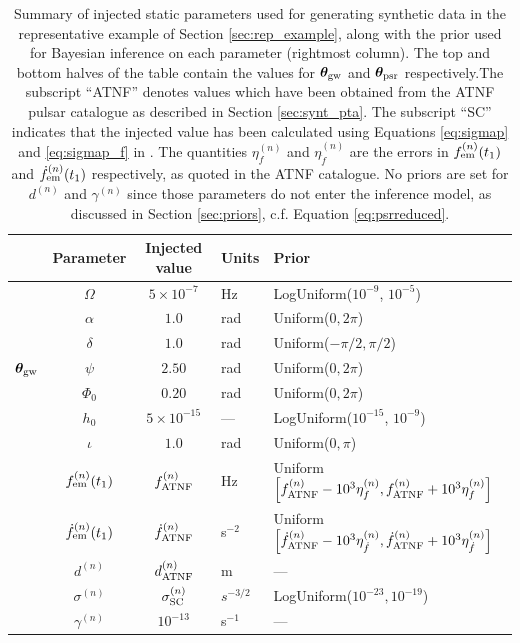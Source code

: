 \documentclass[fleqn,usenatbib,useAMS]{mnras}
\begin{document}
\begin{table}
	\centering
	\begin{tabular}{lccll}
		\toprule
		&Parameter & Injected value & Units & Prior  \\
		\hline
		\multirow{7}{2mm}{$\boldsymbol{\theta}_{\rm gw}$} & $\Omega$       & $5 \times 10^{-7}$ & Hz & LogUniform($10^{-9}$, $10^{-5}$) \\
	  & $\alpha$          & $1.0$  & rad & Uniform($0, 2 \pi $)\\
	  & $\delta$              & $1.0$  & rad & Uniform($-\pi/2, \pi/2$) \\
	  & $\psi$              & $2.50$ & rad & Uniform($0, 2 \pi $) \\
	  & $\Phi_0$          & $0.20$ & rad & Uniform($0, 2 \pi $) \\
	  & $h_0$            & $5 \times 10^{-15}$ & --- & LogUniform($10^{-15}$, $10^{-9}$) \\
	  & $\iota$             & $1.0$ & rad & Uniform($0, \pi$) \\ 
		\hline
		\vspace{1mm}\multirow{5}{2mm}{$\boldsymbol{\theta}_{\rm psr}$} & $f_{\rm em}^{(n)} (t_1)$       & $f_{\rm ATNF}^{(n)}$ & Hz & Uniform$\left[f_{\rm ATNF}^{(n)} - 10^3 \eta^{(n)}_{f}, f_{\rm ATNF}^{(n)} + 10^3 \eta^{(n)}_{f} \right]$ \\
		& $\dot{f}_{\rm em}^{(n)} (t_1)$       & $\dot{f}_{\rm ATNF}^{(n)}$ & s$^{-2}$ & Uniform$\left[ \dot{f}_{\rm ATNF}^{(n)} - 10^3 \eta^{(n)}_{\dot{f}}, \dot{f}_{\rm ATNF}^{(n)} + 10^3 \eta^{(n)}_{\dot{f}} \right]$ \\
		\vspace{1mm} &  $d^{(n)}$       &$d_{\rm ATNF}^{(n)}$  & m & --- \\
		\vspace{1mm} & $\sigma^{(n)}$              & $\sigma_{\rm SC}^{(n)}$ & $s^{-3/2}$ & LogUniform($10^{-23}, 10^{-19}$) \\
		& $\gamma^{(n)}$              & $10^{-13}$ & s$^{-1}$ & --- \\
		\bottomrule
	\end{tabular}
	\caption{Summary of injected static parameters used for generating synthetic data in the representative example of Section \ref{sec:rep_example}, along with the prior used for Bayesian inference on each parameter (rightmost column). The top and bottom halves of the table contain the values for $\boldsymbol{\theta}_{\rm gw}$ and $\boldsymbol{\theta}_{\rm psr}$ respectively.The subscript ``ATNF'' denotes values which have been obtained from the ATNF pulsar catalogue as described in Section \ref{sec:synt_pta}. The subscript ``SC'' indicates that the injected value has been calculated using Equations \eqref{eq:sigmap} and \eqref{eq:sigmap_f} in \protect \cite{Shannon2010}. The quantities $\eta^{(n)}_{f}$ and $\eta^{(n)}_{\dot{f}}$ are the errors in $f^{(n)}_{\rm em} (t_1)$ and $\dot{f}^{(n)}_{\rm em} (t_1)$ respectively, as quoted in the ATNF catalogue. No priors are set for $d^{(n)}$ and $\gamma^{(n)}$ since those parameters do not enter the inference model,  as discussed in Section \ref{sec:priors}, c.f. Equation \eqref{eq:psrreduced}.
}
\end{table}
\end{document}
